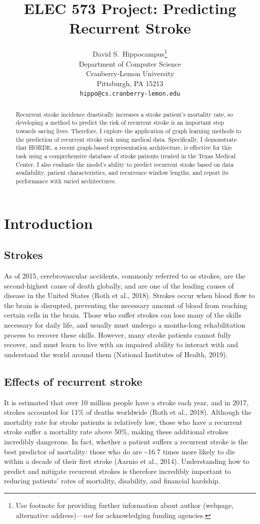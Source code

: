 \documentclass{article}
\title{ELEC 573 Project: Predicting Recurrent Stroke}
\author{%
  David S.~Hippocampus\thanks{Use footnote for providing further information
    about author (webpage, alternative address)---\emph{not} for acknowledging
    funding agencies.} \\
  Department of Computer Science\\
  Cranberry-Lemon University\\
  Pittsburgh, PA 15213 \\
  \texttt{hippo@cs.cranberry-lemon.edu} \\
}
\begin{document}
\maketitle
\vskip -0.2in

\begin{abstract}
\vskip -0.1in
  Recurrent stroke incidence drastically increases a stroke patient's mortality rate, so developing a method to predict the risk of recurrent stroke is an important step towards saving lives. Therefore, I explore the application of graph learning methods to the prediction of recurrent stroke risk using medical data. Specifically, I demonstrate that HORDE, a recent graph-based representation architecture, is effective for this task using a comprehensive database of stroke patients treated in the Texas Medical Center. I also evaluate the model's ability to predict recurrent stroke based on data availability, patient characteristics, and recurrence window lengths, and report its performance with varied architectures.
\end{abstract}

\section{Introduction}

\subsection{Strokes}

As of 2015, cerebrovascular accidents, commonly referred to as strokes, are the second-highest cause of death globally, and are one of the leading causes of disease in the United States (Roth et al., 2018). Strokes occur when blood flow to the brain is disrupted, preventing the necessary amount of blood from reaching certain cells in the brain. Those who suffer strokes can lose many of the skills necessary for daily life, and usually must undergo a months-long rehabilitation process to recover these skills. However, many stroke patients cannot fully recover, and must learn to live with an impaired ability to interact with and understand the world around them (National Institutes of Health, 2019). 

\subsection{Effects of recurrent stroke}

It is estimated that over 10 million people have a stroke each year, and in 2017, strokes accounted for 11\% of deaths worldwide (Roth et al., 2018). Although the mortality rate for stroke patients is relatively low, those who have a recurrent stroke suffer a mortality rate above 50\%, making these additional strokes incredibly dangerous. In fact, whether a patient suffers a recurrent stroke is the best predictor of mortality: those who do are \textasciitilde16.7 times more likely to die within a decade of their first stroke (Aarnio et al., 2014). Understanding how to predict and mitigate recurrent strokes is therefore incredibly important to reducing patients’ rates of mortality, disability, and financial hardship. 
\end{document}
